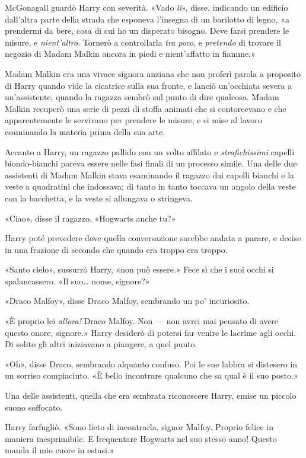 McGonagall guardò Harry con severità. «Vado \textit{lì}», disse, indicando un edificio dall’altra parte della strada che esponeva l’insegna di un barilotto di legno, «a prendermi da bere, cosa di cui ho un disperato bisogno. Deve farsi prendere le misure, e \textit{nient’altro}. Tornerò a controllarla \textit{tra poco}, e \textit{pretendo} di trovare il negozio di Madam Malkin ancora in piedi e nient’affatto in fiamme.»

Madam Malkin era una vivace signora anziana che non proferì parola a proposito di Harry quando vide la cicatrice sulla sua fronte, e lanciò un’occhiata severa a un’assistente, quando la ragazza sembrò sul punto di dire qualcosa. Madam Malkin recuperò una serie di pezzi di stoffa animati che si contorcevano e che apparentemente le servivano per prendere le misure, e si mise al lavoro esaminando la materia prima della sua arte.

Accanto a Harry, un ragazzo pallido con un volto affilato e \textit{strafichissimi} capelli biondo-bianchi pareva essere nelle fasi finali di un processo simile. Una delle due assistenti di Madam Malkin stava esaminando il ragazzo dai capelli bianchi e la veste a quadratini che indossava; di tanto in tanto toccava un angolo della veste con la bacchetta, e la veste si allungava o stringeva.

«Ciao», disse il ragazzo. «Hogwarts anche tu?»

Harry poté prevedere dove quella conversazione sarebbe andata a parare, e decise in una frazione di secondo che quando era troppo era troppo.

«Santo cielo», sussurrò Harry, «non può essere.» Fece sì che i suoi occhi si spalancassero. «Il suo… nome, signore?»

«Draco Malfoy», disse Draco Malfoy, sembrando un po’ incuriosito.

«È proprio lei \textit{allora!} Draco Malfoy. Non — non avrei mai pensato di avere questo onore, signore.» Harry desiderò di potersi far venire le lacrime agli occhi. Di solito gli altri iniziavano a piangere, a quel punto.

«Oh», disse Draco, sembrando alquanto confuso. Poi le sue labbra si distesero in un sorriso compiaciuto. «È bello incontrare qualcuno che sa qual è il suo posto.»

Una delle assistenti, quella che era sembrata riconoscere Harry, emise un piccolo suono soffocato.

Harry farfugliò. «Sono lieto di incontrarla, signor Malfoy. Proprio felice in maniera inesprimibile. E frequentare Hogwarts nel suo stesso anno! Questo manda il mio cuore in estasi.»

